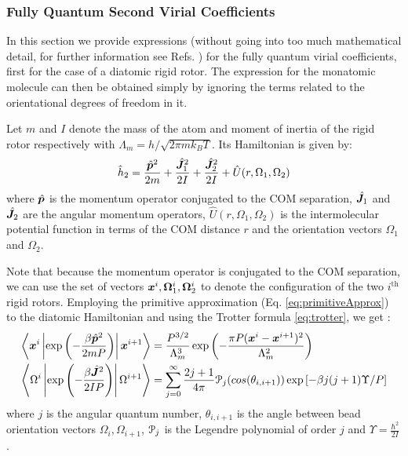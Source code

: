         \subsubsection{Fully Quantum Second Virial Coefficients}
            In this section we provide expressions (without going into too much mathematical detail, for further information see Refs. \cite{Cui1997,Patkowski2008,Garberoglio2009,Garberoglio2014}) for the fully quantum virial coefficients, first for the case of a diatomic rigid rotor. The expression for the monatomic molecule can then be obtained simply by ignoring the terms related to the orientational degrees of freedom in it.

            Let $m$ and $I$ denote the mass of the atom and moment of inertia of the rigid rotor respectively with $\Lambda_m = h/\sqrt{2\pi m k_B T}$. Its Hamiltonian is given by:
            \begin{equation}
            \label{eq:hDiatomic}
                \hat{h}_2 = \displaystyle\frac{\hat{{\boldsymbol {p}}}^2}{2m} + \frac{\hat{{\boldsymbol {J}}}_1^2}{2I} + \frac{\hat{{\boldsymbol {J}}}_2^2}{2I} + \hat{U}(r,\Omega_1,\Omega_2)
            \end{equation}
            where $\hat{{\boldsymbol {p}}}$ is the momentum operator conjugated to the COM separation, $\hat{{\boldsymbol {J}}}_1$ and $\hat{{\boldsymbol {J}}}_2$ are the angular momentum operators, $\hat{U}(r,\Omega_1,\Omega_2)$ is the intermolecular potential function in terms of the COM distance $r$ and the orientation vectors $\Omega_1$ and $\Omega_2$.

            Note that because the momentum operator is conjugated to the COM separation, we can use the set of vectors ${\boldsymbol {x}}^i,{\boldsymbol {\Omega}}_1^i, {\boldsymbol {\Omega}}_2^i$ to denote the configuration of the two $i^\text{th}$ rigid rotors. Employing the primitive approximation (Eq. \eqref{eq:primitiveApprox}) to the diatomic Hamiltonian and using the Trotter formula \ref{eq:trotter}, we get \cite{Cui1997}:
            \begin{equation}
                \begin{aligned}
                    \left< {\boldsymbol {x}}^i \left| \exp \left(-\displaystyle\frac{\beta \hat{{\boldsymbol {p}}}^2}{2 m P} \right) \right| {\boldsymbol {x}}^{i+1} \right> &= \displaystyle\frac{P^{3/2}}{\Lambda_m^3} \exp \left(-\displaystyle\frac{\pi P ({\boldsymbol {x}}^i - {\boldsymbol {x}}^{i+1})^2}{\Lambda_m^2}\right)\\
                    \left< \Omega^i \left| \exp \left(-\displaystyle\frac{\beta \hat{{\boldsymbol {J}}}^2}{2IP} \right) \right| \Omega^{i+1} \right> &= \displaystyle\sum_{j=0}^\infty \frac{2j+1}{4 \pi} \mathcal{P}_j (cos (\theta_{i,i+1}))\exp \left[-\beta j(j+1) \Upsilon/ P \right]
                \end{aligned}
            \end{equation}
            where $j$ is the angular quantum number, $\theta_{i,i+1}$ is the angle between bead orientation vectors $\Omega_i, \Omega_{i+1}$, $\mathcal{P}_j$ is the Legendre polynomial of order $j$ and $\Upsilon = \displaystyle\frac{\hbar^2}{2I}$.

